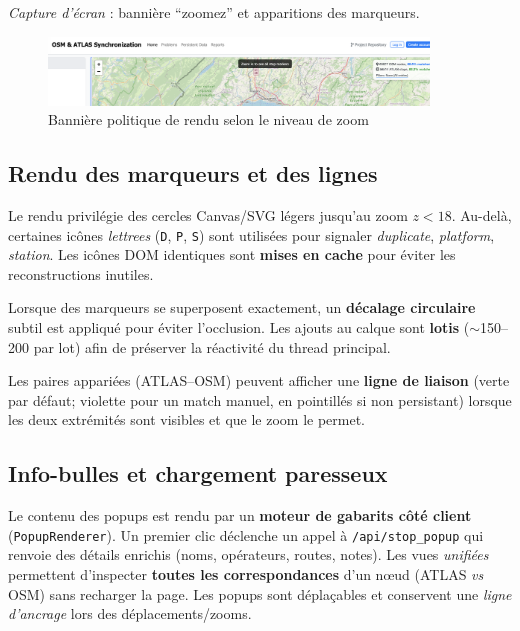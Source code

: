 \noindent
\textit{Capture d'écran} : bannière ``zoomez'' et apparitions des marqueurs.

\begin{figure}[h]
  \centering
  \includegraphics[width=0.9\textwidth]{../figures/chap9/zoom_in_to_see_all_stop_markers.png}
  \caption{Bannière politique de rendu selon le niveau de zoom}
  \label{fig:frontend-zoom-banner}
\end{figure}

\subsection{Rendu des marqueurs et des lignes}
Le rendu privilégie des cercles Canvas/SVG légers jusqu'au zoom \(z<18\). Au-delà, certaines icônes \textit{lettrees} (\texttt{D}, \texttt{P}, \texttt{S}) sont utilisées pour signaler \textit{duplicate}, \textit{platform}, \textit{station}. Les icônes DOM identiques sont \textbf{mises en cache} pour éviter les reconstructions inutiles.

Lorsque des marqueurs se superposent exactement, un \textbf{décalage circulaire} subtil est appliqué pour éviter l'occlusion. Les ajouts au calque sont \textbf{lotis} (\(\sim\)150–200 par lot) afin de préserver la réactivité du thread principal.

Les paires appariées (ATLAS–OSM) peuvent afficher une \textbf{ligne de liaison} (verte par défaut; violette pour un match manuel, en pointillés si non persistant) lorsque les deux extrémités sont visibles et que le zoom le permet.


\subsection{Info-bulles et chargement paresseux}
Le contenu des popups est rendu par un \textbf{moteur de gabarits côté client} (\texttt{PopupRenderer}). Un premier clic déclenche un appel à \texttt{/api/stop\_popup} qui renvoie des détails enrichis (noms, opérateurs, routes, notes). Les vues \textit{unifiées} permettent d'inspecter \textbf{toutes les correspondances} d'un nœud (ATLAS \emph{vs} OSM) sans recharger la page. Les popups sont déplaçables et conservent une \textit{ligne d'ancrage} lors des déplacements/zooms.

